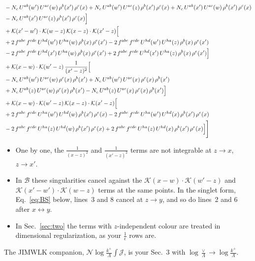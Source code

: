 \documentclass[10pt]{article}
\numberwithin{equation}{section}
\newcommand{\KK}{\mathcal K}
\newcommand{\NN}{\mathcal N}
\newcommand{\BB}{\mathcal B}
\newcommand{\JJ}{\mathcal J}
\begin{document}
\begin{align}
& -N_{c}\,U^{ab}(w')\,U^{ac}(w)\,\rho^{b}(x')\,\rho^{c}(x) +N_{c}\,U^{ab}(w')\,U^{ac}(z)\,\rho^{b}(x')\,\rho^{c}(x) +N_{c}\,U^{ab}(x')\,U^{ac}(w)\,\rho^{b}(x')\,\rho^{c}(x)\notag\\
& -N_{c}\,U^{ab}(x')\,U^{ac}(z)\,\rho^{b}(x')\,\rho^{c}(x)\Big]\notag\\
& +\mathcal{K}(x'-w')\cdot\mathcal{K}(w-z)\,\mathcal{K}(x-z)\cdot\mathcal{K}(x'-z)\Big[\notag\\
& +2\,f^{abc}\,f^{cde}\,U^{hd}(w')\,U^{ha}(w)\,\rho^{b}(x)\,\rho^{e}(x') -2\,f^{abc}\,f^{cde}\,U^{hd}(w')\,U^{ha}(z)\,\rho^{b}(x)\,\rho^{e}(x')\notag\\
& -2\,f^{abc}\,f^{cde}\,U^{hd}(x')\,U^{ha}(w)\,\rho^{b}(x)\,\rho^{e}(x') +2\,f^{abc}\,f^{cde}\,U^{hd}(x')\,U^{ha}(z)\,\rho^{b}(x)\,\rho^{e}(x')\Big]\notag\\
& +\mathcal{K}(x-w)\cdot\mathcal{K}(w'-z)\,\frac{1}{(x'-z)^{2}}\Big[\notag\\
& -N_{c}\,U^{ab}(w')\,U^{ac}(w)\,\rho^{c}(x)\,\rho^{b}(x') +N_{c}\,U^{ab}(w')\,U^{ac}(x)\,\rho^{c}(x)\,\rho^{b}(x')\notag\\
& +N_{c}\,U^{ab}(z)\,U^{ac}(w)\,\rho^{c}(x)\,\rho^{b}(x') -N_{c}\,U^{ab}(z)\,U^{ac}(x)\,\rho^{c}(x)\,\rho^{b}(x')\Big]\notag\\
& +\mathcal{K}(x-w)\cdot\mathcal{K}(w'-z)\,\mathcal{K}(x-z)\cdot\mathcal{K}(x'-z)\Big[\notag\\
& +2\,f^{abc}\,f^{cde}\,U^{ha}(w')\,U^{hd}(w)\,\rho^{b}(x')\,\rho^{e}(x) -2\,f^{abc}\,f^{cde}\,U^{ha}(w')\,U^{hd}(x)\,\rho^{b}(x')\,\rho^{e}(x)\notag\\
& -2\,f^{abc}\,f^{cde}\,U^{ha}(z)\,U^{hd}(w)\,\rho^{b}(x')\,\rho^{e}(x) +2\,f^{abc}\,f^{cde}\,U^{ha}(z)\,U^{hd}(x)\,\rho^{b}(x')\,\rho^{e}(x)\Big]\Bigg]
\end{align}
\begin{itemize}
\item One by one, the $\frac{1}{(x-z)^2}$ and $\frac{1}{(x'-z)^2}$ terms are not integrable at $z\to x$, $z\to x'$.
\item In $\BB$ these singularities cancel against the $\KK(x-w)\cdot\KK(w'-z)$ and $\KK(x'-w')\cdot\KK(w-z)$ terms at the same points. In the singlet form, Eq.~\eqref{eq:BS} below, lines~3 and 8 cancel at $z\to y$, and so do lines~2 and 6 after $x\leftrightarrow y$.
\item In Sec.~\ref{sec:two} the terms with $z$-independent colour are treated in dimensional regularization, as your $\frac1\epsilon$ rows are.
\end{itemize}
The JIMWLK companion, $\NN\log\frac{k^+}{\Lambda}\int\JJ$, is your Sec.~3 with $\log\frac{\vee}{\Lambda}\to\log\frac{k^+}{\Lambda}$.
\end{document}
